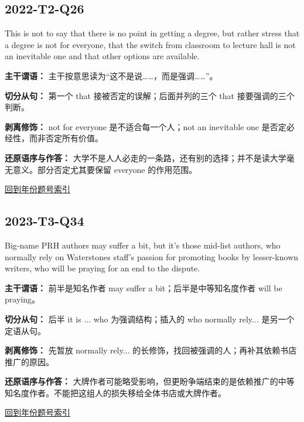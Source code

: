 \documentclass[11pt,a4paper]{article}
\begin{document}
\subsection{2022-T2-Q26}
\begin{evidence}This is not to say that there is no point in getting a degree, but rather stress that a degree is not for everyone, that the switch from classroom to lecture hall is not an inevitable one and that other options are available.\end{evidence}
\noindent\textbf{主干谓语：} 主干按意思读为“这不是说……，而是强调……”。\par\smallskip
\noindent\textbf{切分从句：} 第一个 that 接被否定的误解；后面并列的三个 that 接要强调的三个判断。\par\smallskip
\noindent\textbf{剥离修饰：} not for everyone 是不适合每一个人；not an inevitable one 是否定必经性，而非否定所有价值。\par\smallskip
\noindent\textbf{还原语序与作答：} 大学不是人人必走的一条路，还有别的选择；并不是读大学毫无意义。部分否定尤其要保留 everyone 的作用范围。\par\smallskip
\hyperref[idx-2022-T2-Q26]{回到年份题号索引}\par
\clearpage
\subsection{2023-T3-Q34}
\begin{evidence}Big-name PRH authors may suffer a bit, but it’s those mid-list authors, who normally rely on Waterstones staff’s passion for promoting books by lesser-known writers, who will be praying for an end to the dispute.\end{evidence}
\noindent\textbf{主干谓语：} 前半是知名作者 may suffer a bit；后半是中等知名度作者 will be praying。\par\smallskip
\noindent\textbf{切分从句：} 后半 it is ... who 为强调结构；插入的 who normally rely... 是另一个定语从句。\par\smallskip
\noindent\textbf{剥离修饰：} 先暂放 normally rely... 的长修饰，找回被强调的人；再补其依赖书店推广的原因。\par\smallskip
\noindent\textbf{还原语序与作答：} 大牌作者可能略受影响，但更盼争端结束的是依赖推广的中等知名度作者。不能把这组人的损失移给全体书店或大牌作者。\par\smallskip
\hyperref[idx-2023-T3-Q34]{回到年份题号索引}\par
\end{document}
